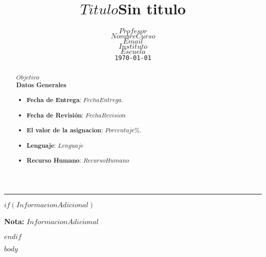 \documentclass[11pt,a4paper]{scrartcl}			%
\title{$Titulo$}
\title{Sin titulo} %
\author{%
	$Profesor$ \\
	\textit{$NombreCurso$} \\
	\texttt{$Email$}\vspace{40pt} \\
	$Instituto$ \\
	$Escuela$ \\
	\texttt{\monthyeardate\today}
	}
\makeatletter
\def\printtitle{%
    {\centering \huge \normalfont \textbf{\@title}\par}}		%
\def\printauthor{%
    {\large \@author}}				%
\makeatother
\begin{document}
\begin{minipage}{0.35\linewidth}
	\begin{flushright}
		\printauthor
	\end{flushright}
\end{minipage} \hspace{0pt}
%
\begin{minipage}{0.02\linewidth}
	\rule{3pt}{175pt}
\end{minipage} \hspace{0pt}
%
\begin{minipage}{0.63\linewidth}
\printtitle 
\vspace{5pt}
	\begin{abstract} 
$Objetivo$ \\

\textbf{Datos Generales}
\begin{itemize}
\item \textbf{Fecha de Entrega}:  $FechaEntrega$. 
\item \textbf{Fecha de Revisión}: $FechaRevision$
\item \textbf{El valor de la asignacion}: $Porcentaje$\%.
\item \textbf{Lenguaje}: $Lenguaje$
\item \textbf{Recurso Humano}: $RecursoHumano$
\end{itemize}
	\end{abstract}
\end{minipage}
\vspace{20pt}		%


$if(InformacionAdicional)$

\textbf{Nota:}
$InformacionAdicional$

$endif$

\spanishsignitems

\setlength{\columnsep}{0.5cm}

\begin{multicols*}{2}


$body$

~\vfill

\end{multicols*}
\end{document}
